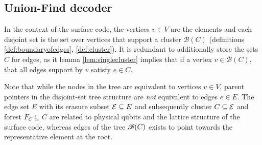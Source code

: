



\subsection{Union-Find decoder}

In the context of the surface code, the vertices $v\in V$ are the elements and each disjoint set is the set over vertices that support a cluster $\mathscr{B}(C)$ (definitions \ref{def:boundaryofedges}, \ref{def:cluster}). It is redundant to additionally store the sets $C$ for edges, as it lemma \ref{lem:singlecluster} implies that if a vertex $v\in \mathscr{B}(C)$, that all edges support by $v$ satisfy $e \in C$. 

Note that while the nodes in the tree are equivalent to vertices $v \in V$, parent pointers in the disjoint-set tree structure are \emph{not} equivalent to edges $e\in E$. The edge set $E$ with its erasure subset $\mathcal{E}\subseteq E$ and subsequently cluster $C\subseteq \mathcal{E}$ and forest $F_C\subseteq C$ are related to physical qubits and the lattice structure of the surface code, whereas edges of the tree $\mathscr{B}(C)$ exists to point towards the representative element at the root.

